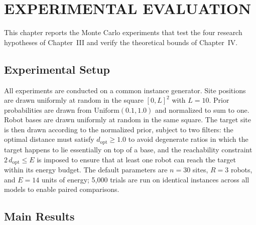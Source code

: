 \chapter{EXPERIMENTAL EVALUATION}\label{ch:results}

\begin{doublespacing}

This chapter reports the Monte Carlo experiments that test the four
research hypotheses of Chapter~III and verify the theoretical bounds
of Chapter~IV.

\section{Experimental Setup}

All experiments are conducted on a common instance generator. Site
positions are drawn uniformly at random in the square $[0, L]^2$ with
$L = 10$. Prior probabilities are drawn from
$\mathrm{Uniform}(0.1, 1.0)$ and normalized to sum to one. Robot bases
are drawn uniformly at random in the same square. The target site is
then drawn according to the normalized prior, subject to two filters:
the optimal distance must satisfy $d_{\mathrm{opt}} \geq 1.0$ to avoid
degenerate ratios in which the target happens to lie essentially on
top of a base, and the reachability constraint
$2\,d_{\mathrm{opt}} \leq E$ is imposed to ensure that at least one
robot can reach the target within its energy budget. The default
parameters are $n = 30$ sites, $R = 3$ robots, and $E = 14$ units of
energy; 5,000 trials are run on identical instances across all models to
enable paired comparisons.

\section{Main Results}\label{sec:main}


\end{doublespacing}
